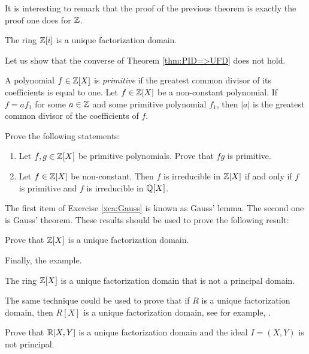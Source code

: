 It is interesting to remark that the proof 
of the previous theorem is exactly the proof
one does for $\mathbb{Z}$. 

\begin{example}
	The ring $\mathbb{Z}[i]$ is a unique factorization domain. 	
\end{example}

Let us show that the converse of Theorem \ref{thm:PID=>UFD} does not hold. 

\begin{exercise}
\label{xca:content}
	A polynomial $f\in\mathbb{Z}[X]$ is \emph{primitive} if
	the greatest common divisor of its coefficients is equal to one. 
	Let $f\in\mathbb{Z}[X]$ be a non-constant polynomial. If $f=af_1$ for some $a\in\mathbb{Z}$ and some
	primitive polynomial $f_1$, then $|a|$ is the greatest common divisor of the coefficients of $f$. 	
\end{exercise}

\begin{exercise}
\label{xca:Gauss}
Prove the following statements:
\begin{enumerate}
    \item Let $f,g\in\mathbb{Z}[X]$ be primitive polynomials. Prove that $fg$ is primitive.
    \item Let $f\in\mathbb{Z}[X]$ be non-constant. Then
$f$ is irreducible in $\mathbb{Z}[X]$ if and only if $f$ is primitive and 
$f$ is irreducible in $\mathbb{Q}[X]$. 
\end{enumerate}
\end{exercise}

The first item of Exercise \ref{xca:Gauss} is known as Gauss' lemma.
The second one is Gauss' theorem. These results should be used to prove
the following result: 

\begin{exercise}
\label{xca:Z[X]_UFD}
    Prove that $\mathbb{Z}[X]$ is a unique factorization domain. 
\end{exercise}

Finally, the example. 

\begin{example}
	The ring $\mathbb{Z}[X]$ is a unique factorization 
	domain that is not a principal domain. 	
\end{example}

The same technique could be used to prove that if 
$R$ is a unique factorization domain, then $R[X]$ 
is a unique factorization domain, see
for example, \cite[Chapter III, Theorem 6.14]{MR600654}.  

\begin{exercise}
    Prove that $\mathbb{R}[X,Y]$ is a unique factorization domain 
    and the ideal $I=(X,Y)$ is not principal. 
\end{exercise}

